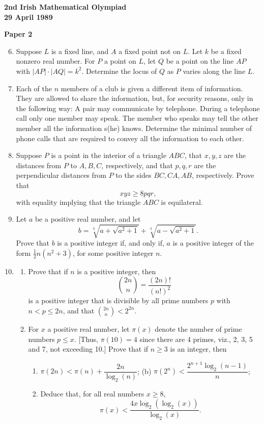 \documentclass[12pt]{article}
\begin{document}
\newpage

\begin{center}
{\large\bfseries 2nd Irish Mathematical Olympiad\\
29 April 1989}
\end{center}

\bigskip
\noindent\textbf{Paper 2}
\bigskip

\begin{enumerate}
\setcounter{enumi}{5}
\item Suppose $L$ is a fixed line, and $A$ a fixed point not on $L$. Let $k$ be a fixed nonzero real number. For $P$ a point on $L$, let $Q$ be a point on the line $AP$ with $|AP|\cdot|AQ| = k^2$. Determine the locus of $Q$ as $P$ varies along the line $L$.

\item Each of the $n$ members of a club is given a different item of information. They are allowed to share the information, but, for security reasons, only in the following way: A pair may communicate by telephone. During a telephone call only one member may speak. The member who speaks may tell the other member all the information s(he) knows. Determine the minimal number of phone calls that are required to convey all the information to each other.

\item Suppose $P$ is a point in the interior of a triangle $ABC$, that $x, y, z$ are the distances from $P$ to $A, B, C$, respectively, and that $p, q, r$ are the perpendicular distances from $P$ to the sides $BC, CA, AB$, respectively. Prove that \[xyz \ge 8pqr,\] with equality implying that the triangle $ABC$ is equilateral.

\item Let $a$ be a positive real number, and let \[b = \sqrt[3]{a + \sqrt{a^2+1}} + \sqrt[3]{a - \sqrt{a^2+1}}.\] Prove that $b$ is a positive integer if, and only if, $a$ is a positive integer of the form $\frac{1}{2}n(n^2+3)$, for some positive integer $n$.

\item \begin{enumerate} \item[(i)] Prove that if $n$ is a positive integer, then \[\binom{2n}{n} = \frac{(2n)!}{(n!)^2}\] is a positive integer that is divisible by all prime numbers $p$ with $n < p \le 2n$, and that $\binom{2n}{n} < 2^{2n}$. \item[(ii)] For $x$ a positive real number, let $\pi(x)$ denote the number of prime numbers $p \le x$. [Thus, $\pi(10) = 4$ since there are 4 primes, viz., 2, 3, 5 and 7, not exceeding 10.] Prove that if $n \ge 3$ is an integer, then \begin{enumerate} \item[(a)] $\pi(2n) < \pi(n) + \dfrac{2n}{\log_2(n)}$; \quad (b) $\pi(2^n) < \dfrac{2^{n+1}\log_2(n-1)}{n}$; \item[(c)] Deduce that, for all real numbers $x \ge 8$, \[\pi(x) < \frac{4x\log_2(\log_2(x))}{\log_2(x)}.\] \end{enumerate} \end{enumerate}

\end{enumerate}
\end{document}
